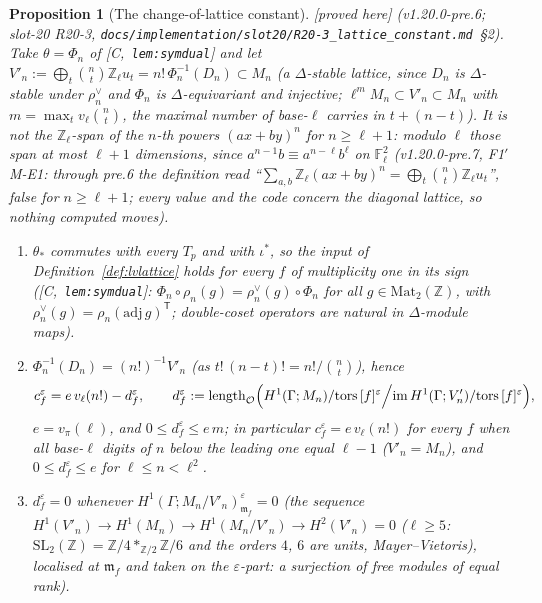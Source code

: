 \documentclass[11pt]{article}
\newtheorem{proposition}[theorem]{Proposition}
\theoremstyle{remark}
\newcommand{\F}{\mathbb{F}}
\newcommand{\Z}{\mathbb{Z}}
\newcommand{\SL}{\mathrm{SL}}
\newcommand{\Ga}{\Gamma}
\newcommand{\De}{\Delta}
\newcommand{\m}{\mathfrak{m}}
\newcommand{\Mn}{M_n}
\newcommand{\Dn}{D_n}
\newcommand{\HA}[1]{[C,~\texttt{#1}]}      %
\newcommand{\PROVED}{\textsf{[proved here]}}
\begin{document}
\begin{proposition}[The change-of-lattice constant]\label{prop:lvlattice}
\PROVED{} (v1.20.0-pre.6; slot-20 R20-3, \texttt{docs/implementation/slot20/R20-3\_lattice\_constant.md}~\S2). Take $\theta=\Phi_n$ of \HA{lem:symdual} and let
$V'_n:=\bigoplus_t\binom nt\Z_\ell u_t=n!\,\Phi_n^{-1}(\Dn)\subset\Mn$ (a $\De$-stable lattice, since $\Dn$ is $\De$-stable under $\rho_n^{\vee}$
and $\Phi_n$ is $\De$-equivariant and injective; $\ell^{m}\Mn\subset V'_n\subset\Mn$ with $m=\max_t v_\ell\binom nt$, the maximal number of base-$\ell$
carries in $t+(n-t)$). It is \emph{not} the $\Z_\ell$-span of the $n$-th powers $(ax+by)^{n}$ for $n\ge\ell+1$: modulo $\ell$ those span at most
$\ell+1$ dimensions, since $a^{n-1}b\equiv a^{n-\ell}b^{\ell}$ on $\F_\ell^{2}$ (v1.20.0-pre.7, F1$'$ M-E1: through pre.6 the definition read
``$\sum_{a,b}\Z_\ell(ax+by)^n=\bigoplus_t\binom nt\Z_\ell u_t$'', false for $n\ge\ell+1$; every value and the code concern the diagonal lattice, so nothing computed moves).
\begin{enumerate}
\item $\theta_\ast$ commutes with every $T_p$ and with $\iota^\ast$, so the input of Definition~\ref{def:lvlattice} holds for every $f$ of multiplicity one in its sign
  (\HA{lem:symdual}: $\Phi_n\circ\rho_n(g)=\rho_n^{\vee}(g)\circ\Phi_n$ for all $g\in\mathrm{Mat}_2(\Z)$, with $\rho_n^{\vee}(g)=\rho_n(\mathrm{adj}\,g)^{\mathsf T}$; double-coset operators are natural in
  $\De$-module maps).
\item $\Phi_n^{-1}(\Dn)=(n!)^{-1}V'_n$ (as $t!\,(n-t)!=n!/\binom nt$), hence
  \[ c^{\varepsilon}_f=e\,v_\ell(n!)-d^{\varepsilon}_f,\qquad d^{\varepsilon}_f:=\mathrm{length}_{\mathcal O}\Bigl(H^{1}(\Ga;\Mn)/\mathrm{tors}\,[f]^{\varepsilon}\Big/\mathrm{im}\,H^{1}(\Ga;V'_n)/\mathrm{tors}\,[f]^{\varepsilon}\Bigr),\]
  $e=v_\pi(\ell)$, and $0\le d^{\varepsilon}_f\le e\,m$; in particular $c_f^{\varepsilon}=e\,v_\ell(n!)$ for every $f$ when all base-$\ell$ digits of $n$ below the leading one equal $\ell-1$ ($V'_n=\Mn$), and
  $0\le d_f^{\varepsilon}\le e$ for $\ell\le n<\ell^{2}$.
\item $d^{\varepsilon}_f=0$ whenever $H^{1}(\Ga;\Mn/V'_n)^{\varepsilon}_{\m_f}=0$ (the sequence $H^{1}(V'_n)\to H^{1}(\Mn)\to H^{1}(\Mn/V'_n)\to H^{2}(V'_n)=0$ ($\ell\ge5$: $\SL_2(\Z)=\Z/4\ast_{\Z/2}\Z/6$ and the orders $4$, $6$ are units, Mayer--Vietoris), localised at $\m_f$ and taken on the
  $\varepsilon$-part: a surjection of free modules of equal rank).
\end{enumerate}
\end{proposition}
\end{document}
